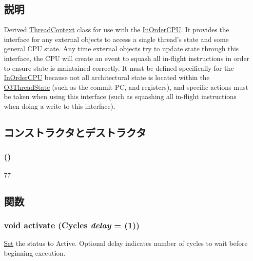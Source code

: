 \subsection{説明}
Derived \hyperlink{classThreadContext}{ThreadContext} class for use with the \hyperlink{classInOrderCPU}{InOrderCPU}. It provides the interface for any external objects to access a single thread's state and some general CPU state. Any time external objects try to update state through this interface, the CPU will create an event to squash all in-\/flight instructions in order to ensure state is maintained correctly. It must be defined specifically for the \hyperlink{classInOrderCPU}{InOrderCPU} because not all architectural state is located within the \hyperlink{structO3ThreadState}{O3ThreadState} (such as the commit PC, and registers), and specific actions must be taken when using this interface (such as squashing all in-\/flight instructions when doing a write to this interface). 

\subsection{コンストラクタとデストラクタ}
\hypertarget{classInOrderThreadContext_af0f21865a9c4fc558cf601f02846f8da}{
\subsubsection[{InOrderThreadContext}]{ ()}}
\label{classInOrderThreadContext_af0f21865a9c4fc558cf601f02846f8da}



\begin{DoxyCode}
77 { }
\end{DoxyCode}


\subsection{関数}
\hypertarget{classInOrderThreadContext_ab542a5cf9ce4b41042d61e42dfe3aeab}{
\subsubsection[{activate}]{\setlength{\rightskip}{0pt plus 5cm}void activate ({\bf Cycles} {\em delay} = {(1)})}}
\label{classInOrderThreadContext_ab542a5cf9ce4b41042d61e42dfe3aeab}
\hyperlink{classSet}{Set} the status to Active. Optional delay indicates number of cycles to wait before beginning execution. 

